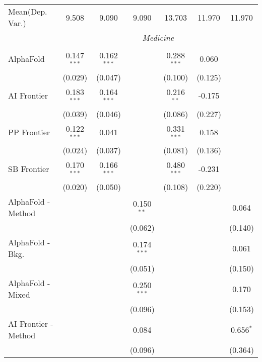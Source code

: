 \begin{tabular}{lcccccc}
Mean(Dep. Var.) & 9.508 & 9.090 & 9.090 & 13.703 & 11.970 & 11.970 \\
 & \multicolumn{6}{c}{\textit{Medicine}} \\ \\
   AlphaFold            & 0.147$^{***}$ & 0.162$^{***}$ &               & 0.288$^{***}$ & 0.060   &   \\   
                        & (0.029)       & (0.047)       &               & (0.100)       & (0.125) &   \\   
   AI Frontier          & 0.183$^{***}$ & 0.164$^{***}$ &               & 0.216$^{**}$  & -0.175  &   \\   
                        & (0.039)       & (0.046)       &               & (0.086)       & (0.227) &   \\   
   PP Frontier          & 0.122$^{***}$ & 0.041         &               & 0.331$^{***}$ & 0.158   &   \\   
                        & (0.024)       & (0.037)       &               & (0.081)       & (0.136) &   \\   
   SB Frontier          & 0.170$^{***}$ & 0.166$^{***}$ &               & 0.480$^{***}$ & -0.231  &   \\   
                        & (0.020)       & (0.050)       &               & (0.108)       & (0.220) &   \\   
   AlphaFold - Method   &               &               & 0.150$^{**}$  &               &         & 0.064\\   
                        &               &               & (0.062)       &               &         & (0.140)\\   
   AlphaFold - Bkg.     &               &               & 0.174$^{***}$ &               &         & 0.061\\   
                        &               &               & (0.051)       &               &         & (0.150)\\   
   AlphaFold - Mixed    &               &               & 0.250$^{***}$ &               &         & 0.170\\   
                        &               &               & (0.096)       &               &         & (0.153)\\   
   AI Frontier - Method &               &               & 0.084         &               &         & 0.656$^{*}$\\   
                        &               &               & (0.096)       &               &         & (0.364)\\   

\end{tabular}
